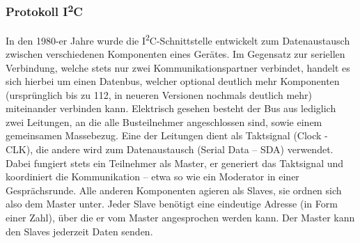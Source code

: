 \subsubsection{Protokoll I\textsuperscript{2}C}
In den 1980-er Jahre wurde die I\textsuperscript{2}C-Schnittstelle entwickelt zum Datenaustausch zwischen verschiedenen Komponenten 
eines Gerätes. Im Gegensatz zur seriellen Verbindung, welche stets nur zwei Kommunikationspartner verbindet, handelt es sich hierbei um einen Datenbus, welcher optional deutlich mehr Komponenten (ursprünglich bis zu 112, in neueren Versionen nochmals deutlich mehr) miteinander verbinden kann. 
Elektrisch gesehen besteht der Bus aus lediglich zwei Leitungen, an die alle Busteilnehmer angeschlossen sind, sowie einem gemeinsamen Massebezug. Eine der Leitungen dient als Taktsignal (Clock - CLK), die andere wird zum Datenaustausch (Serial Data – SDA) verwendet. Dabei fungiert stets ein Teilnehmer als Master, er generiert das Taktsignal und koordiniert die Kommunikation – etwa so wie ein Moderator in einer Gesprächsrunde. Alle anderen Komponenten agieren als Slaves, sie ordnen sich also dem Master unter. Jeder Slave benötigt eine eindeutige Adresse (in Form einer Zahl), über die er vom Master angesprochen werden kann. Der Master kann den Slaves jederzeit Daten senden.

